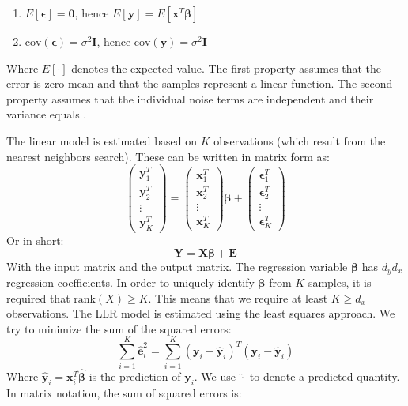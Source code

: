 \begin{enumerate}
	\item $E\left[\bm{\epsilon}\right]=\bm{0}$, hence $E\left[ \mathbf{y} \right] = E\left[ \mathbf{x}^T\bm{\beta} \right]$
	\item $\textrm{cov}(\bm{\epsilon})=\sigma^2\bm{I}$, hence $\textrm{cov}(\mathbf{y})=\sigma^2\bm{I}$
\end{enumerate}
Where $E[\cdot]$ denotes the expected value. The first property assumes that the error is zero mean and that the samples represent a linear function. The second property assumes that the individual noise terms are independent and their variance equals . 

The linear model is estimated based on $K$ observations (which result from the nearest neighbors search). These can be written in matrix form as:
$$
	\left( \begin{array}{c} \mathbf{y}_1^T \\ \mathbf{y}_2^T \\ \vdots \\ \mathbf{y}_K^T \end{array} \right) = 
	\left( \begin{array}{c} \mathbf{x}_1^T \\ \mathbf{x}_2^T \\ \vdots \\ \mathbf{x}_K^T \end{array} \right)
	\bm{\beta} + \left( \begin{array}{c} \bm{\epsilon}_1^T \\ \bm{\epsilon}_2^T \\ \vdots \\ \bm{\epsilon}_K^T \end{array} \right)
$$
Or in short:
$$\label{eqn:LLR-linear model}
	\mathbf{Y} = \mathbf{X}\bm{\beta} + \bm{E}
$$
With  the input matrix and  the output matrix. The regression variable $\bm{\beta}$ has $d_y d_x$ regression coefficients. In order to uniquely identify $\bm{\beta}$ from $K$ samples, it is required that $\textrm{rank}(X) \geq K$. This means that we require at least $K \geq d_x$ observations.
The \ac{LLR} model is estimated using the least squares approach. We try to minimize the sum of the squared errors:
$$ 
 \sum_{i=1}^{K}{ \hat{\mathbf{e}}_i^2} = \sum_{i=1}^{K}{\left( \mathbf{y}_i - \mathbf{\hat{y}}_i\right)^T\left( \mathbf{y}_i - \mathbf{\hat{y}}_i\right)}
$$
Where $\mathbf{\hat{y}}_i = \mathbf{x}_i^T\bm{\hat{\beta}}$ is the prediction of $\mathbf{y}_i$. We use $\hat{\cdot}$ to denote a predicted quantity. In matrix notation, the sum of squared errors is:
